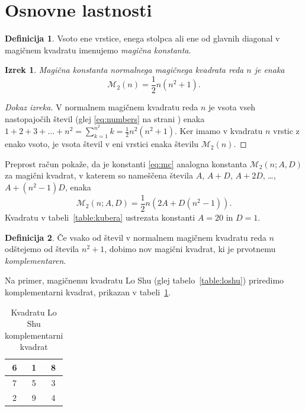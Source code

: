 \documentclass[a4paper,12pt]{article}
\newcommand{\m}{\mathcal{M}_2}
\newcommand{\pojem}[1]{\emph{#1\color{purple}}}
\newenvironment{magic}[3]{\begin{table}[!ht]
   \centering
   \caption{#1}
   \label{#2}
   \large
   \begin{tabular}{|*{#3}{c|}}
   \hline}{\end{tabular}
   \normalsize
\end{table}}
\theoremstyle{definition}
\newtheorem{definicija}{Definicija}
\theoremstyle{plain}
\newtheorem{izrek}{Izrek}
\begin{document}

\section{Osnovne lastnosti}

\begin{definicija}
   Vsoto ene vrstice, enega stolpca ali ene od glavnih diagonal
   v magičnem kvadratu imenujemo \pojem{magična konstanta\color{purple}}.
\end{definicija}

\begin{izrek}
   Magična konstanta normalnega magičnega kvadrata reda \(n\)
   je enaka
   \begin{equation}
      \label{eq:mc}
      \m(n) = \frac{1}{2} n(n^2+1).
   \end{equation}
\end{izrek}

\begin{proof}[Dokaz izreka]
   V normalnem magičnem kvadratu reda \(n\) je vsota vseh nastopajočih
   števil (glej \eqref{eq:numbers} na strani \pageref{eq:numbers}) enaka
   \(1+2+3+\ldots+n^2=\sum_{k=1}^{n^2}k=\frac{1}{2}n^2(n^2+1)\). Ker imamo
   v kvadratu \(n\) vrstic z enako vsoto, je vsota števil v eni vrstici
   enaka številu \(\m(n)\).
\end{proof}

Preprost račun pokaže, da je konstanti \eqref{eq:mc} analogna konstanta
\(\m(n;A,D)\) za magični kvadrat, v katerem so nameščena števila
\(A\), \(A+D\), \(A+2D\), \ldots, \(A+(n^2-1)D\), enaka
\[
   \m(n;A,D) = \frac{1}{2} n \left(2A+D(n^2-1)\right).
\]
Kvadratu v tabeli~\ref{table:kubera} ustrezata konstanti \(A=20\) in \(D=1\). %

\begin{definicija}
   Če vsako od števil v normalnem magičnem kvadratu reda \(n\) odštejemo
   od števila \(n^2+1\), dobimo nov magični kvadrat, ki je prvotnemu
   \pojem{komplementaren\color{purple}}.
\end{definicija}

Na primer, magičnemu kvadratu Lo Shu (glej tabelo~\ref{table:loshu}) priredimo
komplementarni kvadrat, prikazan v tabeli~\ref{table:closhu}. %
%
\begin{magic}{Kvadratu Lo Shu komplementarni kvadrat}{table:closhu}{3}
   6 & 1 & 8 \\\hline
   7 & 5 & 3 \\\hline
   2 & 9 & 4 \\\hline
\end{magic}
\end{document}
